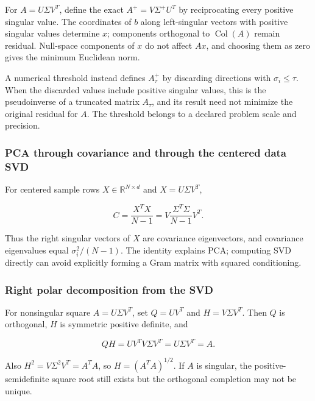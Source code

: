 For \(A=U\Sigma V^T\), define the exact \(A^+=V\Sigma^+U^T\) by reciprocating every positive singular value. The coordinates of \(b\) along left-singular vectors with positive singular values determine \(x\); components orthogonal to \(\operatorname{Col}(A)\) remain residual. Null-space components of \(x\) do not affect \(Ax\), and choosing them as zero gives the minimum Euclidean norm.

A numerical threshold instead defines \(A_\tau^+\) by discarding directions with \(\sigma_i\le\tau\). When the discarded values include positive singular values, this is the pseudoinverse of a truncated matrix \(A_\tau\), and its result need not minimize the original residual for \(A\). The threshold belongs to a declared problem scale and precision.

\subsubsection{PCA through covariance and through the centered data SVD}\label{02-foundations-ii-ch039-pca-through-covariance-and-through-the-centered-data-svd}

\hypertarget{02-foundations-ii-ch039-pca-through-covariance-and-through-the-centered-data-svd}{}

For centered sample rows \(X\in\mathbb R^{N\times d}\) and \(X=U\Sigma V^T\),

\[
C=\frac{X^TX}{N-1}
=V\frac{\Sigma^T\Sigma}{N-1}V^T.
\]

Thus the right singular vectors of \(X\) are covariance eigenvectors, and covariance eigenvalues equal \(\sigma_i^2/(N-1)\). The identity explains PCA; computing SVD directly can avoid explicitly forming a Gram matrix with squared conditioning.

\subsubsection{Right polar decomposition from the SVD}\label{02-foundations-ii-ch039-right-polar-decomposition-from-the-svd}

\hypertarget{02-foundations-ii-ch039-right-polar-decomposition-from-the-svd}{}

For nonsingular square \(A=U\Sigma V^T\), set \(Q=UV^T\) and \(H=V\Sigma V^T\). Then \(Q\) is orthogonal, \(H\) is symmetric positive definite, and

\[
QH=UV^TV\Sigma V^T=U\Sigma V^T=A.
\]

Also \(H^2=V\Sigma^2V^T=A^TA\), so \(H=(A^TA)^{1/2}\). If \(A\) is singular, the positive-semidefinite square root still exists but the orthogonal completion may not be unique.


